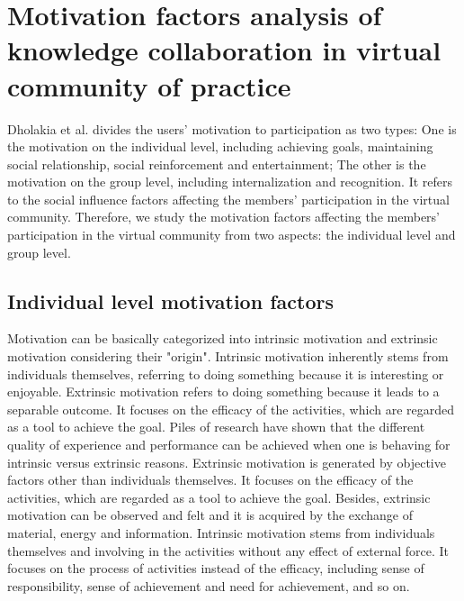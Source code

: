 \documentclass[doublespacing]{elsarticle}
\begin{document}
\section{Motivation factors analysis of knowledge collaboration in virtual community of practice}
\label{sec:motiv-fact-analys}


 Dholakia et al. \cite{dholakia2004241}divides the users' motivation
 to participation as two types: One is the motivation on the
 individual level, including achieving goals, maintaining social
 relationship, social reinforcement and entertainment; The other is
 the motivation on the group level, including internalization and
 recognition. It refers to the social influence factors affecting the
 members' participation in the virtual community. Therefore, we study the motivation factors affecting the members' participation in the virtual community from two aspects: the individual level and group level.  

\subsection{Individual level motivation factors}
\label{sec:individual-level}

Motivation can be basically categorized into intrinsic motivation and
extrinsic motivation considering their "origin". Intrinsic motivation
inherently  stems from individuals themselves, referring to doing something because it is interesting or enjoyable. Extrinsic motivation refers to doing something
because it leads to a separable outcome.  It focuses on the efficacy
of the activities, which are regarded as a tool to achieve the goal. Piles of research have
shown that the different quality of experience and performance can be achieved
when one is behaving for intrinsic versus extrinsic
reasons\cite{Ryan200054}.  Extrinsic motivation is generated by
objective factors other than individuals themselves. It focuses on the
efficacy of the activities, which are regarded as a tool to achieve
the goal. Besides, extrinsic motivation can be observed and felt and
it is acquired by the exchange of material, energy and
information. Intrinsic motivation stems from individuals themselves
and involving in the activities without any effect of external
force. It focuses on the process of activities instead of the
efficacy, including sense of responsibility, sense of achievement and
need for achievement, and so on. 
\end{document}
